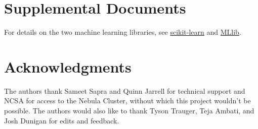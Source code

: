 \documentclass[9pt,twocolumn,twoside]{idsi}
\begin{document}
\section*{Supplemental Documents}
For details on the two machine learning libraries, see \href{http://scikit-learn.org/stable/index.html}{scikit-learn} and \href{http://spark.apache.org/mllib/}{MLlib}.

\section*{Acknowledgments}
The authors thank Sameet Sapra and Quinn Jarrell for technical support and NCSA for access to the Nebula Cluster, without which this project wouldn't be possible. The authors would also like to thank Tyson Trauger, Teja Ambati, and Josh Dunigan for edits and feedback.



\end{document}
